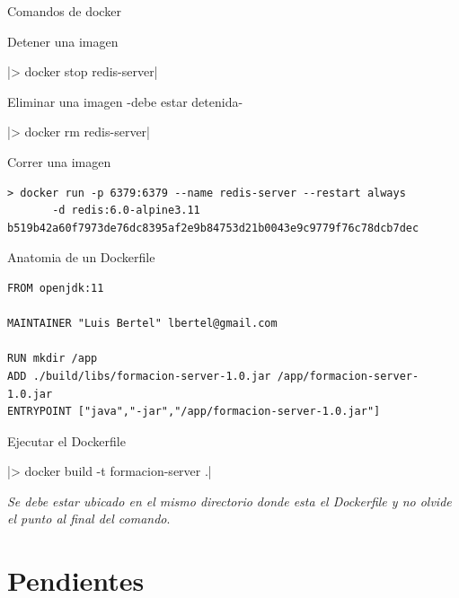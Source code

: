 \documentclass[10pt]{beamer}
\begin{document}
\begin{frame}[fragile]{Comandos de docker}

\alert{Detener una imagen}

|> docker stop redis-server|

\alert{Eliminar una imagen -debe estar detenida-}

|> docker rm redis-server|

\alert{Correr una imagen}

\begin{verbatim}
> docker run -p 6379:6379 --name redis-server --restart always 
       -d redis:6.0-alpine3.11
b519b42a60f7973de76dc8395af2e9b84753d21b0043e9c9779f76c78dcb7dec
\end{verbatim}

\end{frame}


\begin{frame}[fragile]{Anatomia de un Dockerfile}


\begin{verbatim}
FROM openjdk:11

MAINTAINER "Luis Bertel" lbertel@gmail.com

RUN mkdir /app
ADD ./build/libs/formacion-server-1.0.jar /app/formacion-server-1.0.jar
ENTRYPOINT ["java","-jar","/app/formacion-server-1.0.jar"]
\end{verbatim}

\alert{Ejecutar el Dockerfile}

|> docker build -t formacion-server .|

\emph{Se debe estar ubicado en el mismo directorio donde esta el Dockerfile y 
no olvide el punto al final del comando}.

\end{frame}


\section{Pendientes}
\end{document}
